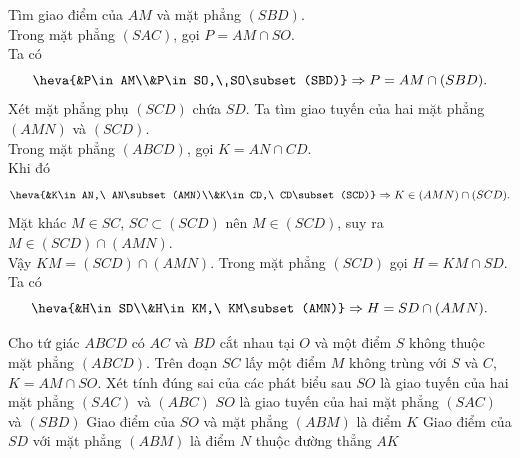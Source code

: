 \begin{ex}
{\begin{itemchoice}
			\itemch Tìm giao điểm của $AM$  và mặt phẳng $(SBD)$.\\
			Trong mặt phẳng $(SAC)$, gọi  $P=AM\cap SO$.\\
			 Ta có
			\[\heva{&P\in AM\\&P\in  SO,\ SO\subset(SBD)}\Rightarrow P=AM\cap(SBD).\]
			\itemch Xét  mặt phẳng phụ $(SCD)$ chứa $SD$. Ta tìm giao tuyến của hai mặt phẳng $(AMN)$ và $(SCD)$.\\
			Trong mặt phẳng $(ABCD)$, gọi $K=AN\cap  CD$.\\
			Khi  đó
			\[\heva{&K\in AN,\  AN\subset(AMN)\\&K\in CD,\ CD\subset(SCD)}\Rightarrow K\in(AMN)\cap(SCD).\]
			Mặt  khác $M\in SC$, $SC\subset(SCD)$ nên $M\in(SCD)$, suy ra $M\in(SCD)\cap(AMN)$.\\
			Vậy  $KM=(SCD)\cap(AMN)$.
			 \itemch Trong mặt phẳng $(SCD)$ gọi $H=KM\cap SD$.\\
			 Ta có
			\[\heva{&H\in SD\\&H\in KM,\  KM\subset(AMN)}\Rightarrow H=SD\cap(AMN).\]
		\end{itemchoice}
	 }
\end{ex}

\begin{ex}%
 Cho tứ giác $ABCD$ có $AC$ và $BD$ cắt nhau tại $O$ và  một điểm $S$ không thuộc mặt phẳng $(ABCD)$. Trên đoạn $SC$ lấy một điểm $M$ không trùng với $S$ và $C$, $K=AM\cap SO$. Xét tính đúng sai của các phát biểu sau
 \choiceTF 
  {$SO$ là giao tuyến của  hai mặt phẳng $(SAC)$ và $(ABC)$}
   {\True $SO$ là giao tuyến của hai mặt phẳng $(SAC)$ và $(SBD)$}
  {\True Giao điểm của $SO$  và mặt phẳng $(ABM)$ là điểm $K$}
  {Giao điểm của $SD$  với mặt phẳng $(ABM)$ là điểm $N$ thuộc đường thẳng $AK$}
\end{ex}

